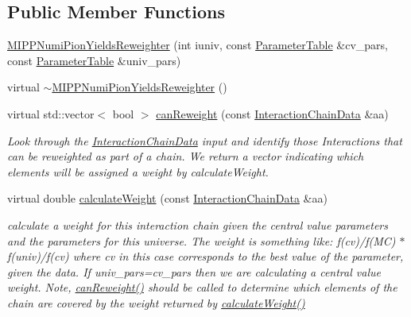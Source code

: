 \subsection*{Public Member Functions}
\begin{DoxyCompactItemize}
\item 
\hyperlink{class_neutrino_flux_reweight_1_1_m_i_p_p_numi_pion_yields_reweighter_a0936dda1619b4d977b07868216d67d16}{M\-I\-P\-P\-Numi\-Pion\-Yields\-Reweighter} (int iuniv, const \hyperlink{class_neutrino_flux_reweight_1_1_parameter_table}{Parameter\-Table} \&cv\-\_\-pars, const \hyperlink{class_neutrino_flux_reweight_1_1_parameter_table}{Parameter\-Table} \&univ\-\_\-pars)
\item 
virtual \hyperlink{class_neutrino_flux_reweight_1_1_m_i_p_p_numi_pion_yields_reweighter_a6779850f19e6cf219b2ea83eed20b223}{$\sim$\-M\-I\-P\-P\-Numi\-Pion\-Yields\-Reweighter} ()
\item 
virtual std\-::vector$<$ bool $>$ \hyperlink{class_neutrino_flux_reweight_1_1_m_i_p_p_numi_pion_yields_reweighter_a6a716b25ddb7d29ace9c7f07d84c91b2}{can\-Reweight} (const \hyperlink{class_neutrino_flux_reweight_1_1_interaction_chain_data}{Interaction\-Chain\-Data} \&aa)
\begin{DoxyCompactList}\small\item\em Look through the \hyperlink{class_neutrino_flux_reweight_1_1_interaction_chain_data}{Interaction\-Chain\-Data} input and identify those Interactions that can be reweighted as part of a chain. We return a vector indicating which elements will be assigned a weight by calculate\-Weight. \end{DoxyCompactList}\item 
virtual double \hyperlink{class_neutrino_flux_reweight_1_1_m_i_p_p_numi_pion_yields_reweighter_a84ef113a8ef34c2f9f5813938ec35382}{calculate\-Weight} (const \hyperlink{class_neutrino_flux_reweight_1_1_interaction_chain_data}{Interaction\-Chain\-Data} \&aa)
\begin{DoxyCompactList}\small\item\em calculate a weight for this interaction chain given the central value parameters and the parameters for this universe. The weight is something like\-: f(cv)/f(M\-C) $\ast$ f(univ)/f(cv) where cv in this case corresponds to the best value of the parameter, given the data. If univ\-\_\-pars=cv\-\_\-pars then we are calculating a central value weight. Note, \hyperlink{class_neutrino_flux_reweight_1_1_m_i_p_p_numi_pion_yields_reweighter_a6a716b25ddb7d29ace9c7f07d84c91b2}{can\-Reweight()} should be called to determine which elements of the chain are covered by the weight returned by \hyperlink{class_neutrino_flux_reweight_1_1_m_i_p_p_numi_pion_yields_reweighter_a84ef113a8ef34c2f9f5813938ec35382}{calculate\-Weight()} \end{DoxyCompactList}\end{DoxyCompactItemize}
